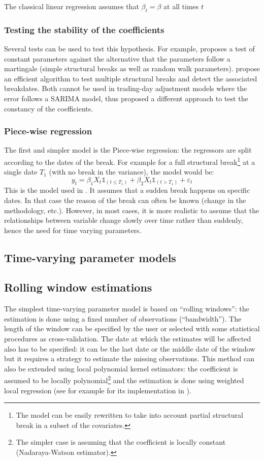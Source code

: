 \documentclass[12pt,a4paper]{article}
\begin{document}
The classical linear regression assumes that \(\beta_t=\beta\) at all times \(t\) 
\subsubsection{Testing the stability of the coefficients}
Several tests can be used to test this hypothesis.
For example, \citet{hansen1992testing} proposes a test of constant parameters against the alternative that the parameters follow a martingale (simple structural breaks as well as random walk parameters).
\citet{bai2003computation} propose an efficient algorithm to test multiple structural breaks and detect the associated breakdates.
Both cannot be used in trading-day adjustment models where the error follows a SARIMA model, thus \citet{abs2006} proposed a different approach to test the constancy of the coefficients.

\subsubsection{Piece-wise regression}
The first and simpler model is the Piece-wise regression: the regressors are split according to the dates of the break.
For example for a full structural break\footnote{The model can be easily rewritten to take into account partial structural break in a subset of the covariates.} at a single date \(T_1\) (with no break in the variance), the model would be:
\[
y_t=\beta_1 X_t \mathds 1_{(t\leq T_1)} + \beta_2X_t\mathds 1_{(t>T_1)}+\varepsilon_t
\]
This is the model used in \citet{bai2003computation}.
It assumes that a sudden break happens on specific dates.
In that case the reason of the break can often be known (change in the methodology, etc.).
However, in most cases, it is more realistic to assume that the relationships between variable change slowly over time rather than suddenly, hence the need for time varying parameters.

\subsection{Time-varying parameter models}

\subsection{Rolling window estimations}

The simplest time-varying parameter model is based on ``rolling windows'': the estimation is done using a fixed number of observations (``bandwidth'').
The length of the window can be specified by the user or selected with some statistical procedures as cross-validation.
The date at which the estimates will be affected also has to be specified: it can be the last date or the middle date of the window but it requires a strategy to estimate the missing observations.
This method can also be extended using local polynomial kernel estimators: the coefficient is assumed to be locally polynomial\footnote{The simpler case is assuming that the coefficient is locally constant (Nadaraya-Watson estimator).} and the estimation is done using weighted local regression (see for example \citet{tvReg} for its implementation in ).
\end{document}
